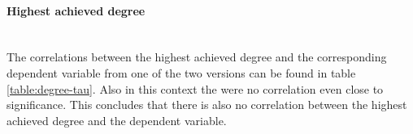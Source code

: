 \begin{table}[htb]
  \caption{Correlation between experience with software development and the dependent variables calculated with the \gls{tau} without the subjects that had experience with\gls{see}}
  \label{table:sd-tau}
  \end{table}

\paragraph{Highest achieved degree}\mbox{}\\
The correlations between the highest achieved degree and the corresponding dependent variable from one of the two versions can be found in table \ref{table:degree-tau}.
Also in this context the were no correlation even close to significance. 
This concludes that there is also no correlation between the highest achieved degree and the dependent variable.

